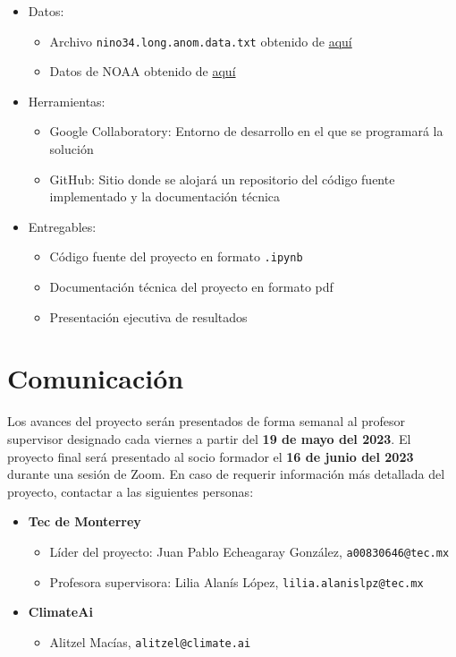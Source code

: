 \documentclass{article}
\begin{document}
        \begin{itemize}
            \item Datos:
            \begin{itemize}
                \item Archivo \texttt{nino34.long.anom.data.txt} obtenido de \href{https://github.com/ClimateAI/TDA_ClimateAI/blob/main/nino34.long.anom.data.txt}{aquí}
                \item Datos de NOAA obtenido de \href{https://www.cpc.ncep.noaa.gov/data/indices/sstoi.indices}{aquí}
            \end{itemize}
            \item Herramientas:
            \begin{itemize}
                \item Google Collaboratory: Entorno de desarrollo en el que se programará la solución
                \item GitHub: Sitio donde se alojará un repositorio del código fuente implementado y la documentación técnica
            \end{itemize}
            \item Entregables:
            \begin{itemize}
                \item Código fuente del proyecto en formato \texttt{.ipynb}
                \item Documentación técnica del proyecto en formato pdf
                \item Presentación ejecutiva de resultados
            \end{itemize}
        \end{itemize}

    \section{Comunicación}

        Los avances del proyecto serán presentados de forma semanal al profesor supervisor designado cada viernes a partir del \textbf{19 de mayo del 2023}. El proyecto final será presentado al socio formador el \textbf{16 de junio del 2023} durante una sesión de Zoom. En caso de requerir información más detallada del proyecto, contactar a las siguientes personas:
        \begin{itemize}
            \item \textbf{Tec de Monterrey}
            \begin{itemize}
                \item Líder del proyecto: Juan Pablo Echeagaray González, \texttt{a00830646@tec.mx}
                \item Profesora supervisora: Lilia Alanís López, \texttt{lilia.alanislpz@tec.mx}
            \end{itemize}
            \item \textbf{ClimateAi}
            \begin{itemize}
                \item Alitzel Macías, \texttt{alitzel@climate.ai}
            \end{itemize}
        \end{itemize}
\end{document}
